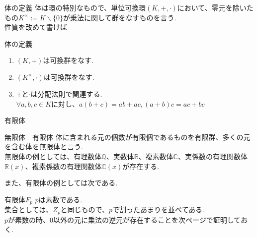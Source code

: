 \documentclass[dvipdfmx,11pt,notheorems]{beamer}
\begin{document}
\begin{frame}{体の定義}
  \alert{体}は環の特別なもので、単位可換環$(K,+,\cdot)$において、零元を除いたもの$K^\times := K\backslash \{0\}$が乗法に関して群をなすものを言う. \\
  性質を改めて書けば
  \begin{block}{体の定義}
    \begin{enumerate}
      \item $(K,+)$は可換群をなす.
      \item $(K^\times,\cdot)$は可換群をなす.
      \item $+$と$\cdot$は分配法則で関連する. \\
      $\forall a,b,c \in K$に対し、$a(b+c)=ab + ac,    (a+b)c=ac+bc$
    \end{enumerate}
  \end{block}
\end{frame}

\begin{frame}{有限体}
  \begin{block}{無限体　有限体}
    体に含まれる元の個数が有限個であるものを\alert{有限群}、多くの元を含む体を\alert{無限体}と言う. \\
    無限体の例としては、有理数体$\mathbb{Q}$、実数体$\mathbb{R}$、複素数体$\mathbb{C}$、実係数の有理関数体$\mathbb{R}(x)$、複素係数の有理関数体$\mathbb{C}(x)$が存在する.
  \end{block}
  また、有限体の例としては次である.
  \begin{exampleblock}{有限体$F_p$}
    $p$は素数である.\\
    集合としては、$Z_p$と同じもので、$p$で割ったあまりを並べてある.\\
    $p$が素数の時、$0$以外の元に乗法の逆元が存在することを次ページで証明しておく.
  \end{exampleblock}
\end{frame}
\end{document}
